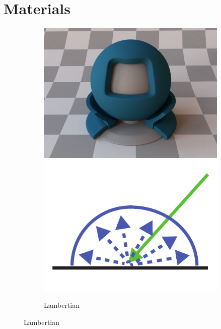 \section{Materials}
\begin{figure}
    \centering
    \begin{subfigure}[t]{0.32\linewidth}
        \centering
        \begin{minipage}[t]{\linewidth}
            \includegraphics[width=\linewidth]{imgs/lambertian_render.png}
            \includegraphics[width=\linewidth]{imgs/lambertian.pdf}
        \end{minipage}
        \caption{Lambertian}
        \label{fig:lambertian}
    \end{subfigure}

\end{figure}

